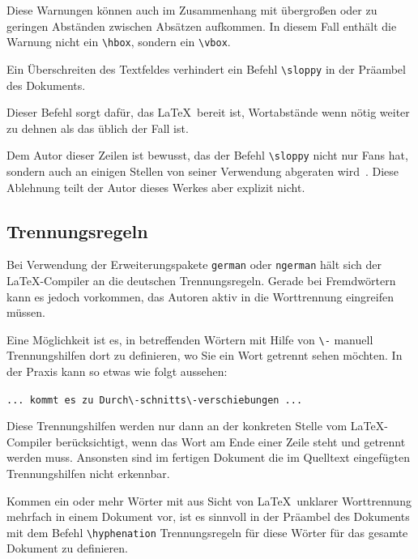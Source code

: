 \documentclass[a4paper,10pt,twoside]{scrbook}
\begin{document}
Diese Warnungen können auch im Zusammenhang mit übergroßen oder zu geringen Abständen zwischen Absätzen aufkommen. In diesem Fall enthält die Warnung nicht ein \verb!\hbox!, sondern ein \verb!\vbox!.

Ein Überschreiten des Textfeldes verhindert ein Befehl \verb!\sloppy! in der Präambel des Dokuments. 


Dieser Befehl sorgt dafür, das \LaTeX\ bereit ist, Wortabstände wenn nötig weiter zu dehnen als das üblich der Fall ist.

Dem Autor dieser Zeilen ist bewusst, das der Befehl \verb!\sloppy! nicht nur Fans hat, sondern auch an einigen Stellen von seiner
Verwendung abgeraten wird~\cite{LaTeXSuendenregisterLink}. Diese Ablehnung teilt der Autor dieses Werkes aber explizit nicht.

\subsection{Trennungsregeln}

Bei Verwendung der Erweiterungspakete \verb!german! oder \verb|ngerman| hält sich der \LaTeX-Compiler an die deutschen Trennungsregeln.
Gerade bei Fremdwörtern kann es jedoch vorkommen, das Autoren aktiv in die Worttrennung eingreifen müssen.

Eine Möglichkeit ist es, in betreffenden Wörtern mit Hilfe von \verb|\-| manuell Trennungshilfen dort zu definieren, wo Sie ein Wort getrennt
sehen möchten. In der Praxis kann so etwas 
wie folgt aussehen:

\verb!... kommt es zu Durch\-schnitts\-verschiebungen ...!

Diese Trennungshilfen werden nur dann an der konkreten Stelle vom \LaTeX-Compiler berücksichtigt, wenn das Wort am 
Ende einer Zeile steht und getrennt werden muss. Ansonsten sind im fertigen Dokument die im Quelltext eingefügten Trennungshilfen 
nicht erkennbar.

Kommen ein oder mehr Wörter mit aus Sicht von \LaTeX\ unklarer Worttrennung mehrfach in einem Dokument vor, ist es sinnvoll
in der Präambel des Dokuments mit dem Befehl \verb!\hyphenation! Trennungsregeln für diese Wörter für das gesamte Dokument zu definieren. 

\end{document}
